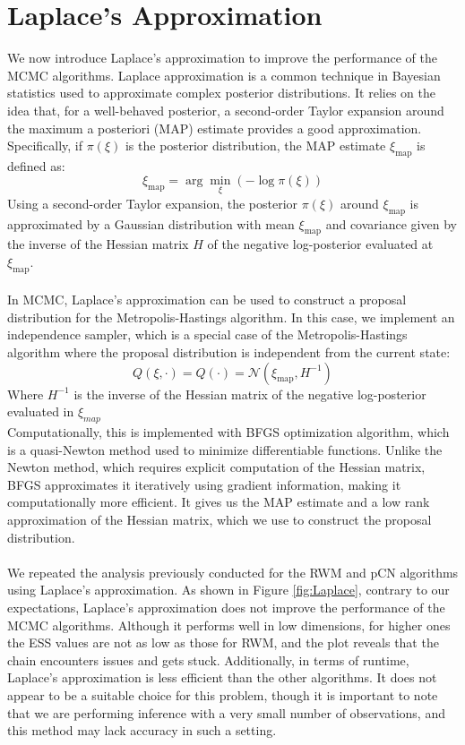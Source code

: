 \documentclass{article}
\begin{document}
\section{Laplace's Approximation}
We now introduce Laplace's approximation to improve the performance of the MCMC algorithms. Laplace approximation is a common technique in Bayesian statistics 
used to approximate complex posterior distributions. It relies on the idea that, for a well-behaved posterior, a second-order Taylor expansion around the 
maximum a posteriori (MAP) estimate provides a good approximation. Specifically, if \(\pi(\xi)\) is the posterior distribution, the MAP estimate \(\xi_{\text{map}}\) 
is defined as:
\begin{equation*}
    \xi_{\text{map}} = \arg \min_{\xi} (-\log \pi(\xi))
\end{equation*} 
Using a second-order Taylor expansion, the posterior \(\pi(\xi)\) around \(\xi_{\text{map}}\) is approximated by a Gaussian 
distribution with mean \(\xi_{\text{map}}\) and covariance given by the inverse of the Hessian matrix \(H\) of the negative log-posterior 
evaluated at \(\xi_{\text{map}}\).\\\\
In MCMC, Laplace’s approximation can be used to construct a proposal distribution for the Metropolis-Hastings algorithm. 
In this case, we implement an independence sampler, which is a special case of the Metropolis-Hastings algorithm where the proposal distribution is independent from the current state:
\begin{equation*}
    Q(\xi,\cdot) = Q(\cdot) = \mathcal{N}(\xi_{\text{map}}, H^{-1})
\end{equation*}
Where $H^{-1}$ is the inverse of the Hessian matrix of the negative log-posterior evaluated in $\xi_{map}$\\
Computationally, this is implemented with BFGS optimization algorithm, which is a quasi-Newton method used to minimize differentiable functions. Unlike the Newton method, which requires explicit 
computation of the Hessian matrix, BFGS approximates it iteratively using gradient information, making it computationally more efficient.
It gives us the MAP estimate and a low rank approximation of the Hessian matrix, which we use to construct the proposal distribution.\\\\
We repeated the analysis previously conducted for the RWM and pCN algorithms using Laplace's approximation. 
As shown in Figure \ref{fig:Laplace}, contrary to our expectations, Laplace's approximation does not improve 
the performance of the MCMC algorithms. Although it performs well in low dimensions, for higher ones the ESS values are not as low as those for RWM, 
and the plot reveals that the chain encounters issues and gets stuck. Additionally, in terms of runtime, Laplace's approximation is 
less efficient than the other algorithms. It does not appear to be a suitable choice for this problem, though it 
is important to note that we are performing inference with a very small number of observations, and this method 
may lack accuracy in such a setting.
\end{document}
